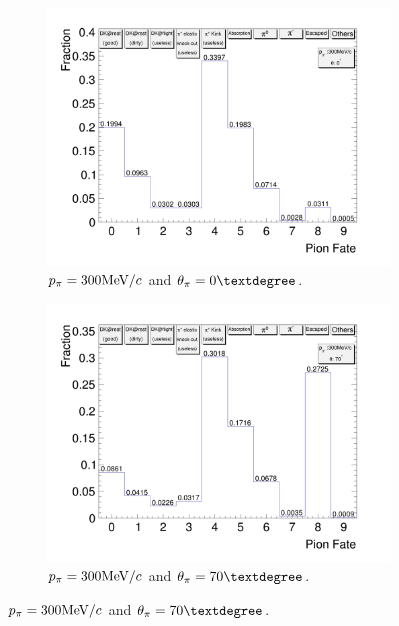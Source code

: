 \begin{figure}[t]
\begin{subfigure}{\dbfigwid\textwidth}
               \end{subfigure}
              \\
               \begin{subfigure}{\dbfigwid\textwidth}
                    \includegraphics[width=\textwidth]{figures/sel/pion_fate_300_0.png}
                    \caption{$p_{\pi}=300\textrm{MeV}/c$ and $\tpi=0\deg$.}
                    \label{subfig:pi-fate-300-0}
               \end{subfigure}
               \begin{subfigure}{\dbfigwid\textwidth}
                    \includegraphics[width=\textwidth]{figures/sel/pion_fate_300_70.png}
                    \caption{$p_{\pi}=300\textrm{MeV}/c$ and $\tpi=70\deg$.}

\end{subfigure}
\end{figure}
